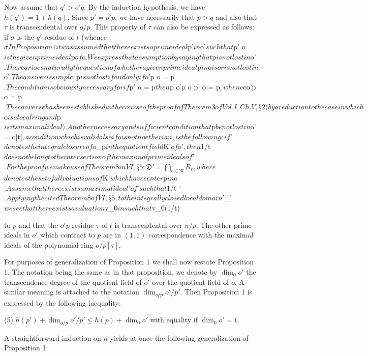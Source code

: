 Now assume that $q' > o'q$. By the induction hypothesis, we have $h(q') = 1 + h(q)$. Since $p' = o'p$, we have necessarily that $p > q$ and also that $\tau$ is transcendental over $o/p$. This property of $\tau$ can also be expressed as follows: if $\sigma$ is the $q'$-residue of $t$ (whence $\sigma

In Proposition 1 it was assumed that there exists a prime ideal $p'$ in $o'$ such that $p' \cap o$ is the given prime ideal $p$ of $o$. We express that assumption by saying that $p$ is not lost in $o'$. There arises naturally the question of whether a given prime ideal $p$ in $o$ is or is not lost in $o'$. The answer is simple: $p$ is not lost if and only if $o'p \cap o = p$. The condition is obviously necessary for if $p' \cap o = p$ then $p \subset o'p \cap o \subset p' \cap o = p$, whence $o'p \cap o = p$. The converse has been established in the course of the proof of Theorem 3 of Vol. I, Ch. V, § 2 (by a reduction to the case in which $o$ is a local ring and $p$ is its maximal ideal).

Another necessary and sufficient condition that $p$ be not lost in $o' = o[t]$, a condition which is valid also if $o$ is not noetherian, is the following: if $'$ denotes the integral closure of $o_p$ in the quotient field $K'$ of $o'$, then $1/t$ does not belong to the intersection of the maximal prime ideals of $'$. For the proof we make use of Theorem 8 in VI, § 5:

$$\mathfrak{D}' = \bigcap_{v \in \mathfrak{N}} R_v,$$

where $$ denotes the set of all valuations of $K'$ which have center $p$ in $o$. Assume that there exists a maximal ideal $'$ of $'$ such that $1/t \notin {}'$. Applying the cited Theorem 8 of VI, § 5, to the integrally closed local domain $'_{'}$ we see that there exists a valuation $v_0$ in $$ such that $v_0(1/t) \leq

to $p$ and that the $o'p$-residue $\tau$ of $t$ is transcendental over $n/p$. The other prime ideals in $o'$ which contract to $p$ are in $(1, 1)$ correspondence with the maximal ideals of the polynomial ring $o/p[\tau]$.

For purposes of generalization of Proposition 1 we shall now restate Proposition 1. The notation being the same as in that proposition, we denote by $\dim_0 o'$ the transcendence degree of the quotient field of $o'$ over the quotient field of $o$. A similar meaning is attached to the notation $\dim_{o/p} o'/p'$. Then Proposition 1 is expressed by the following inequality:

(5) $h(p') + \dim_{o/p} o'/p' \leq h(p) + \dim_0 o'$ with equality if $\dim_0 o' = 1$.

A straightforward induction on $n$ yields at once the following generalization of Proposition 1: